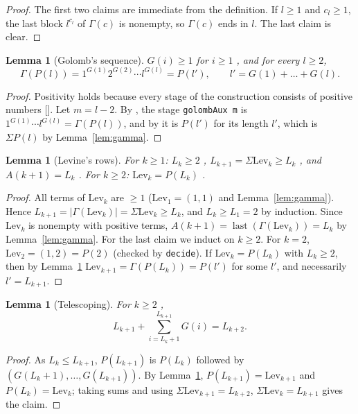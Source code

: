 \documentclass[11pt]{amsart}
\theoremstyle{plain}
\newtheorem{lemma}[theorem]{Lemma}
\theoremstyle{definition}
\newcommand{\Lev}{\mathrm{Lev}}
\newcommand{\last}{\operatorname{last}}
\newcommand{\len}[1]{\lvert #1\rvert}
\begin{document}
\begin{proof}
The first two claims are immediate from the definition. If $l\ge1$ and $c_l\ge1$, the last block $l^{c_l}$ of $\Gamma(c)$ is nonempty, so $\Gamma(c)$ ends in $l$. The last claim is clear.
\end{proof}

\begin{lemma}[Golomb's sequence]\label{lem:golomb}
$G(i)\ge1$ for $i\ge1$ {}, and for every $l\ge2$,
\[
  \Gamma(P(l))=1^{G(1)}2^{G(2)}\cdots l^{G(l)}=P(l'),\qquad l'=G(1)+\dots+G(l).
\]
\end{lemma}

\begin{proof}
Positivity holds because every stage of the construction consists of positive numbers []. Let $m=l-2$. By , the stage \texttt{golombAux m} is $1^{G(1)}\cdots l^{G(l)}=\Gamma(P(l))$, and by  it is $P(l')$ for its length $l'$, which is $\Sigma P(l)$ by Lemma~\ref{lem:gamma}.
\end{proof}

\begin{lemma}[Levine's rows]\label{lem:levine}
For $k\ge1$: $L_k\ge2$ {}, $L_{k+1}=\Sigma\Lev_k\ge L_k$ {}, and $A(k+1)=L_k$ {}. For $k\ge2$: $\Lev_k=P(L_k)$ {}.
\end{lemma}

\begin{proof}
All terms of $\Lev_k$ are $\ge1$ ($\Lev_1=(1,1)$ and Lemma~\ref{lem:gamma}). Hence $L_{k+1}=\len{\Gamma(\Lev_k)}=\Sigma\Lev_k\ge L_k$, and $L_k\ge L_1=2$ by induction. Since $\Lev_k$ is nonempty with positive terms, $A(k+1)=\last(\Gamma(\Lev_k))=L_k$ by Lemma~\ref{lem:gamma}.
For the last claim we induct on $k\ge2$. For $k=2$, $\Lev_2=(1,2)=P(2)$ (checked by \texttt{decide}). If $\Lev_k=P(L_k)$ with $L_k\ge2$, then by Lemma~\ref{lem:golomb} $\Lev_{k+1}=\Gamma(P(L_k))=P(l')$ for some $l'$, and necessarily $l'=L_{k+1}$.
\end{proof}

\begin{lemma}[Telescoping]\label{lem:tele}
For $k\ge2$ {},
\[
  L_{k+1}+\sum_{i=L_k+1}^{L_{k+1}}G(i)=L_{k+2}.
\]
\end{lemma}

\begin{proof}
As $L_k\le L_{k+1}$, $P(L_{k+1})$ is $P(L_k)$ followed by $(G(L_k+1),\dots,G(L_{k+1}))$. By Lemma~\ref{lem:levine}, $P(L_{k+1})=\Lev_{k+1}$ and $P(L_k)=\Lev_k$; taking sums and using $\Sigma\Lev_{k+1}=L_{k+2}$, $\Sigma\Lev_k=L_{k+1}$ gives the claim.
\end{proof}
\end{document}

